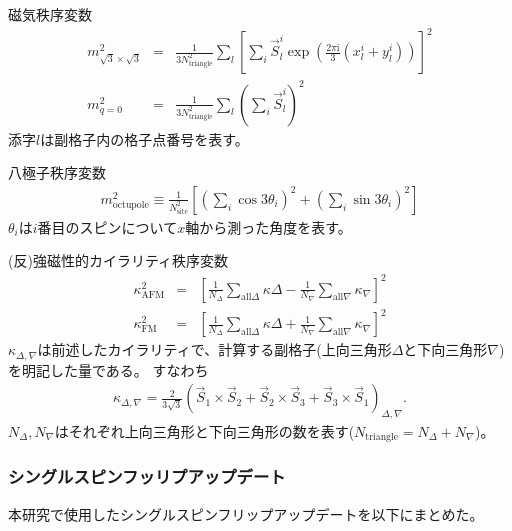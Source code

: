 \documentclass[12pt,titlepage,dvipdfmx]{jarticle}
\begin{document}
磁気秩序変数
\begin{eqnarray}
   m^2_{\mathrm{\sqrt3\times\sqrt3}} &=& 
   \frac{1}{3N^2_{\mathrm{triangle}}}\sum_{l}\left[\sum_{i} \vec S_l^i \exp\left( \frac{2\pi\mathrm{i}}{3}(x_l^i+y_l^i)\right)\right]^2\\
   m^2_{q=0}                         &=& 
   \frac{1}{3N^2_{\mathrm{triangle}}}\sum_{l}\left(\sum_{i} \vec S_l^i \right)^2
\end{eqnarray}
添字$l$は副格子内の格子点番号を表す。

八極子秩序変数
\begin{align}
   m^2_{\mathrm{octupole}} \equiv 
\frac{1}{N_{\mathrm{site}}^2}\left[ \left(\sum_i \cos 3\theta_i \right)^2+\left(\sum_i\sin 3\theta_i\right)^2\right]
\end{align}
$\theta_i$は$i$番目のスピンについて$x$軸から測った角度を表す。

(反)強磁性的カイラリティ秩序変数
\begin{eqnarray}
   \kappa_{\mathrm{AFM}}^2 &=& 
   \left[ \frac{1}{N_{\Delta}}\sum_{\mathrm{all}\Delta}\kappa{\Delta} - \frac{1}{N_{\nabla}}\sum_{\mathrm{all}\nabla}\kappa_{\nabla}\right]^2\\
   \kappa_{\mathrm{FM}}^2  &=& 
   \left[ \frac{1}{N_{\Delta}}\sum_{\mathrm{all}\Delta}\kappa{\Delta} + \frac{1}{N_{\nabla}}\sum_{\mathrm{all}\nabla}\kappa_{\nabla}\right]^2
\end{eqnarray}
$\kappa_{\Delta,\nabla}$は前述したカイラリティで、計算する副格子(上向三角形$\Delta$と下向三角形$\nabla$)を明記した量である。
すなわち
\begin{align}
   \kappa_{\Delta,\nabla} = \frac{2}{3\sqrt{3}}(\vec S_1 \times \vec S_2 + \vec S_2 \times \vec S_3 + \vec S_3 \times \vec S_1)_{\Delta,\nabla}.
\end{align}
$N_{\Delta},N_{\nabla}$はそれぞれ上向三角形と下向三角形の数を表す($N_{\mathrm{triangle}}=N_{\Delta}+N_{\nabla}$)。

\subsubsection{シングルスピンフッリプアップデート}
本研究で使用したシングルスピンフリップアップデートを以下にまとめた。
\end{document}
